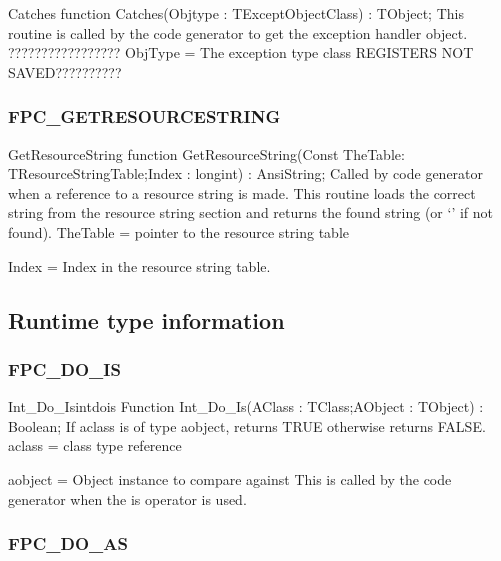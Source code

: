 \documentclass [a4paper,12pt]{article}
\begin{document}
\begin{function}{Catches}
\Declaration
function Catches(Objtype : TExceptObjectClass) : TObject;
\Description
This routine is called by the code generator to get the exception handler
object. ?????????????????
\Parameters
ObjType = The exception type class
\Notes
REGISTERS NOT SAVED??????????
\end{function}

\subsubsection{FPC{\_}GETRESOURCESTRING}
\label{subsubsec:mylabel68}

\begin{function}{GetResourceString}
\Declaration
function GetResourceString(Const TheTable: TResourceStringTable;Index : longint) : AnsiString;
\Description
Called by code generator when a reference to a resource string is made. This
routine loads the correct string from the resource string section and
returns the found string (or `' if not found).
\Parameters
TheTable = pointer to the resource string table \par
Index = Index in the resource string table.
\end{function}

\subsection{Runtime type information}
\label{subsec:runtime}

\subsubsection{FPC{\_}DO{\_}IS}
\label{subsubsec:mylabel69}

\begin{functionl}{Int{\_}Do{\_}Is}{intdois}
\Declaration
Function Int{\_}Do{\_}Is(AClass : TClass;AObject : TObject) : Boolean;
\Description
If \textsf{aclass} is of type \textsf{aobject}, returns TRUE otherwise
returns FALSE.
\Parameters
aclass = class type reference \par
aobject = Object instance to compare against
\Notes
This is called by the code generator when the \textsf{is} operator is used.
\Algorithm
\end{functionl}

\subsubsection{FPC{\_}DO{\_}AS}
\label{subsubsec:mylabel70}
\end{document}
